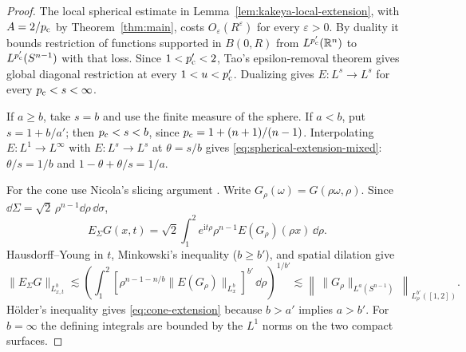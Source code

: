\begin{proof}
The local spherical estimate in Lemma~\ref{lem:kakeya-local-extension},
with \(A=2/p_{\mathrm c}\) by Theorem~\ref{thm:main},
costs \(O_\varepsilon(R^\varepsilon)\) for every \(\varepsilon>0\).
By duality it bounds restriction of functions supported in \(B(0,R)\)
from \(L^{p_{\mathrm c}'}(\mathbb R^n)\) to \(L^{p_{\mathrm c}'}(S^{n-1})\) with that loss.
Since \(1<p_{\mathrm c}'<2\), Tao's epsilon-removal theorem
\cite[Theorem~1.2]{Tao1999} gives global diagonal restriction at
every \(1<u<p_{\mathrm c}'\). Dualizing gives \(E:L^s\to L^s\) for every
\(p_{\mathrm c}<s<\infty\).

If \(a\ge b\), take \(s=b\) and use the finite measure of the sphere.
If \(a<b\), put \(s=1+b/a'\); then \(p_{\mathrm c}<s<b\), since
\(p_{\mathrm c}=1+(n+1)/(n-1)\). Interpolating \(E:L^1\to L^\infty\) with
\(E:L^s\to L^s\) at \(\theta=s/b\) gives \eqref{eq:spherical-extension-mixed}:
\(\theta/s=1/b\) and \(1-\theta+\theta/s=1/a\).

For the cone use Nicola's slicing argument
\cite[Theorem~1.2(a)(i)]{Nicola2009}. Write \(G_\rho(\omega)=G(\rho\omega,\rho)\).
Since \(\dd\Sigma=\sqrt2\,\rho^{n-1}\dd\rho\,\dd\sigma\),
\[
 E_\Sigma G(x,t)=\sqrt2\int_1^2e^{\mathrm it\rho}\rho^{n-1}
                   E(G_\rho)(\rho x)\,\dd\rho .
\]
Hausdorff--Young in \(t\), Minkowski's inequality (\(b\ge b'\)),
and spatial dilation give
\[
 \|E_\Sigma G\|_{L^b_{x,t}}
 \lesssim\left(\int_1^2
       [\rho^{n-1-n/b}\|E(G_\rho)\|_{L^b_x}]^{b'}\,\dd\rho\right)^{1/b'}
 \lesssim\left\|\,\|G_\rho\|_{L^a(S^{n-1})}\,\right\|_{L^{b'}_\rho([1,2])}.
\]
H\"older's inequality gives \eqref{eq:cone-extension} because \(b>a'\)
implies \(a>b'\). For \(b=\infty\) the defining integrals are bounded
by the \(L^1\) norms on the two compact surfaces.
\end{proof}
